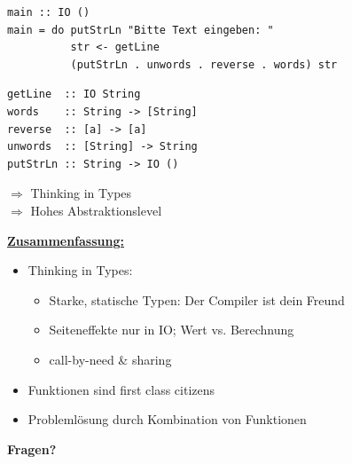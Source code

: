 \documentclass[unknownkeysallowed]{beamer}
\begin{document}
  \begin{frame}[fragile]

  \begin{verbatim}
main :: IO ()
main = do putStrLn "Bitte Text eingeben: "
          str <- getLine
          (putStrLn . unwords . reverse . words) str
  \end{verbatim}
  
\pause

  \begin{verbatim}
getLine  :: IO String
words    :: String -> [String]
reverse  :: [a] -> [a]
unwords  :: [String] -> String
putStrLn :: String -> IO ()
  \end{verbatim}
\bigskip 
\pause

$\Rightarrow$ Thinking in Types      \\ \pause
$\Rightarrow$ Hohes Abstraktionslevel

\end{frame}


\begin{frame}

\Large\textbf{\underline{Zusammenfassung:}}\bigskip\normalsize
\pause

\begin{itemize}
\item Thinking in Types: \pause
      \begin{itemize}
      \item Starke, statische Typen: Der Compiler ist dein Freund \pause
      \item Seiteneffekte nur in IO; Wert vs. Berechnung \pause
      \item call-by-need \& sharing
      \end{itemize}
\item Funktionen sind \glqq first class citizens\grqq \pause
\item Problemlösung durch Kombination von Funktionen
\end{itemize}
  
\end{frame}



\begin{frame}

\begin{center}
\Large\textbf{Fragen?}
\end{center}

\end{frame}
  
\end{document}
